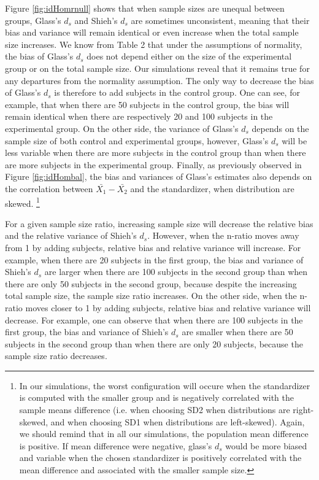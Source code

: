 \documentclass[
  man,floatsintext]{apa6}
\begin{document}
Figure \ref{fig:idHomrnull} shows that when sample sizes are unequal between groups, Glass's \(d_s\) and Shieh's \(d_s\) are sometimes unconsistent, meaning that their bias and variance will remain identical or even increase when the total sample size increases. We know from Table 2 that under the assumptions of normality, the bias of Glass's \(d_s\) does not depend either on the size of the experimental group or on the total sample size. Our simulations reveal that it remains true for any departures from the normality assumption. The only way to decrease the bias of Glass's \(d_s\) is therefore to add subjects in the control group. One can see, for example, that when there are 50 subjects in the control group, the bias will remain identical when there are respectively 20 and 100 subjects in the experimental group. On the other side, the variance of Glass's \(d_s\) depends on the sample size of both control and experimental groups, however, Glass's \(d_s\) will be less variable when there are more subjects in the control group than when there are more subjects in the experimental group. Finally, as previously observed in Figure \ref{fig:idHombal}, the bias and variances of Glass's estimates also depends on the correlation between \(\bar{X_1}-\bar{X_2}\) and the standardizer, when distribution are skewed. \footnote{In our simulations, the worst configuration will occure when the standardizer is computed with the smaller group and is negatively correlated with the sample means difference (i.e. when choosing SD2 when distributions are right-skewed, and when choosing SD1 when distributions are left-skewed). Again, we should remind that in all our simulations, the population mean difference is positive. If mean difference were negative, glass's $d_s$ would be more biased and variable when the chosen standardizer is positively correlated with the mean difference and associated with the smaller sample size.}

For a given sample size ratio, increasing sample size will decrease the relative bias and the relative variance of Shieh's \(d_s\). However, when the n-ratio moves away from 1 by adding subjects, relative bias and relative variance will increase. For example, when there are 20 subjects in the first group, the bias and variance of Shieh's \(d_s\) are larger when there are 100 subjects in the second group than when there are only 50 subjects in the second group, because despite the increasing total sample size, the sample size ratio increases. On the other side, when the n-ratio moves closer to 1 by adding subjects, relative bias and relative variance will decrease. For example, one can observe that when there are 100 subjects in the first group, the bias and variance of Shieh's \(d_s\) are smaller when there are 50 subjects in the second group than when there are only 20 subjects, because the sample size ratio decreases.
\end{document}
